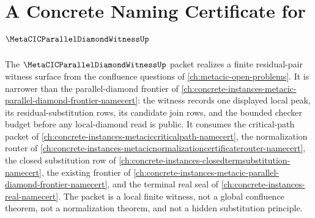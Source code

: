\chapter{A Concrete Naming Certificate for $\MetaCICParallelDiamondWitnessUp$}
\label{ch:concrete-instances-metacic-parallel-diamond-witness-namecert}

The $\MetaCICParallelDiamondWitnessUp$ packet realizes a finite residual-pair witness surface from the confluence questions of \autoref{ch:metacic-open-problems}. It is narrower than the parallel-diamond frontier of \autoref{ch:concrete-instances-metacic-parallel-diamond-frontier-namecert}: the witness records one displayed local peak, its residual-substitution rows, its candidate join rows, and the bounded checker budget before any local-diamond read is public. It consumes the critical-path packet of \autoref{ch:concrete-instances-metaciccriticalpath-namecert}, the normalization router of \autoref{ch:concrete-instances-metacicnormalizationcertificaterouter-namecert}, the closed substitution row of \autoref{ch:concrete-instances-closedtermsubstitution-namecert}, the existing frontier of \autoref{ch:concrete-instances-metacic-parallel-diamond-frontier-namecert}, and the terminal real seal of \autoref{ch:concrete-instances-real-namecert}. The packet is a local finite witness, not a global confluence theorem, not a normalization theorem, and not a hidden substitution principle.

